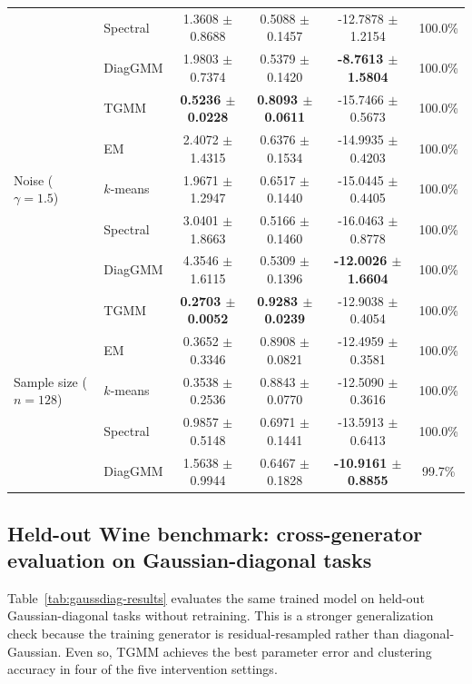 \documentclass{article}
\newcommand{\tgmm}{\textsc{TGMM}}
\begin{document}
\begin{table}[t]
\begin{threeparttable}
{\begin{tabular}{llcccc}
& Spectral & 1.3608 $\pm$ 0.8688 & 0.5088 $\pm$ 0.1457 & -12.7878 $\pm$ 1.2154 & 100.0\% \\
& DiagGMM & 1.9803 $\pm$ 0.7374 & 0.5379 $\pm$ 0.1420 & \textbf{-8.7613 $\pm$ 1.5804} & 100.0\% \\
\midrule
\multirow{5}{*}{Noise ($\gamma=1.5$)}
& TGMM & \textbf{0.5236 $\pm$ 0.0228} & \textbf{0.8093 $\pm$ 0.0611} & -15.7466 $\pm$ 0.5673 & 100.0\% \\
& EM & 2.4072 $\pm$ 1.4315 & 0.6376 $\pm$ 0.1534 & -14.9935 $\pm$ 0.4203 & 100.0\% \\
& $k$-means & 1.9671 $\pm$ 1.2947 & 0.6517 $\pm$ 0.1440 & -15.0445 $\pm$ 0.4405 & 100.0\% \\
& Spectral & 3.0401 $\pm$ 1.8663 & 0.5166 $\pm$ 0.1460 & -16.0463 $\pm$ 0.8778 & 100.0\% \\
& DiagGMM & 4.3546 $\pm$ 1.6115 & 0.5309 $\pm$ 0.1396 & \textbf{-12.0026 $\pm$ 1.6604} & 100.0\% \\
\midrule
\multirow{5}{*}{Sample size ($n=128$)}
& TGMM & \textbf{0.2703 $\pm$ 0.0052} & \textbf{0.9283 $\pm$ 0.0239} & -12.9038 $\pm$ 0.4054 & 100.0\% \\
& EM & 0.3652 $\pm$ 0.3346 & 0.8908 $\pm$ 0.0821 & -12.4959 $\pm$ 0.3581 & 100.0\% \\
& $k$-means & 0.3538 $\pm$ 0.2536 & 0.8843 $\pm$ 0.0770 & -12.5090 $\pm$ 0.3616 & 100.0\% \\
& Spectral & 0.9857 $\pm$ 0.5148 & 0.6971 $\pm$ 0.1441 & -13.5913 $\pm$ 0.6413 & 100.0\% \\
& DiagGMM & 1.5638 $\pm$ 0.9944 & 0.6467 $\pm$ 0.1828 & \textbf{-10.9161 $\pm$ 0.8855} & 99.7\% \\
\bottomrule
\end{tabular}%
}
\end{threeparttable}
\end{table}

\subsection{Held-out Wine benchmark: cross-generator evaluation on Gaussian-diagonal tasks}
Table~\ref{tab:gaussdiag-results} evaluates the same trained model on held-out Gaussian-diagonal tasks without retraining. This is a stronger generalization check because the training generator is residual-resampled rather than diagonal-Gaussian. Even so, \tgmm{} achieves the best parameter error and clustering accuracy in four of the five intervention settings.
\end{document}
